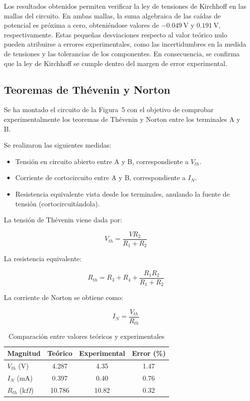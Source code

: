 \documentclass[a4paper,12pt]{article}
\begin{document}
Los resultados obtenidos permiten verificar la ley de tensiones de Kirchhoff en las mallas del circuito. En ambas mallas, la suma algebraica de las caídas de potencial es próxima a cero, obteniéndose valores de $-0.049\ \text{V}$ y $0.191\ \text{V}$, respectivamente. Estas pequeñas desviaciones respecto al valor teórico nulo pueden atribuirse a errores experimentales, como las incertidumbres en la medida de tensiones y las tolerancias de los componentes. En consecuencia, se confirma que la ley de Kirchhoff se cumple dentro del margen de error experimental.

\subsection{Teoremas de Thévenin y Norton}

Se ha montado el circuito de la Figura~5 con el objetivo de comprobar experimentalmente los teoremas de Thévenin y Norton entre los terminales A y B.

Se realizaron las siguientes medidas:

\begin{itemize}
    \item Tensión en circuito abierto entre A y B, correspondiente a $V_{th}$.
    \item Corriente de cortocircuito entre A y B, correspondiente a $I_N$.
    \item Resistencia equivalente vista desde los terminales, anulando la fuente de tensión (cortocircuitándola).
\end{itemize}


La tensión de Thévenin viene dada por:

\[
V_{th} = \frac{V R_2}{R_1 + R_2}
\]

La resistencia equivalente:

\[
R_{th} = R_3 + R_4 + \frac{R_1 R_2}{R_1 + R_2}
\]

La corriente de Norton se obtiene como:

\[
I_N = \frac{V_{th}}{R_{th}}
\]

\begin{table}[h]
\centering
\begin{tabular}{lccc}
\hline
Magnitud & Teórico & Experimental & Error (\%) \\
\hline
$V_{th}$ (V) & 4.287 & 4.35 & 1.47 \\
$I_N$ (mA) & 0.397 & 0.40 & 0.76 \\
$R_{th}$ (k$\Omega$) & 10.786 & 10.82 & 0.32 \\
\hline
\end{tabular}
\caption{Comparación entre valores teóricos y experimentales}
\end{table}
\end{document}
